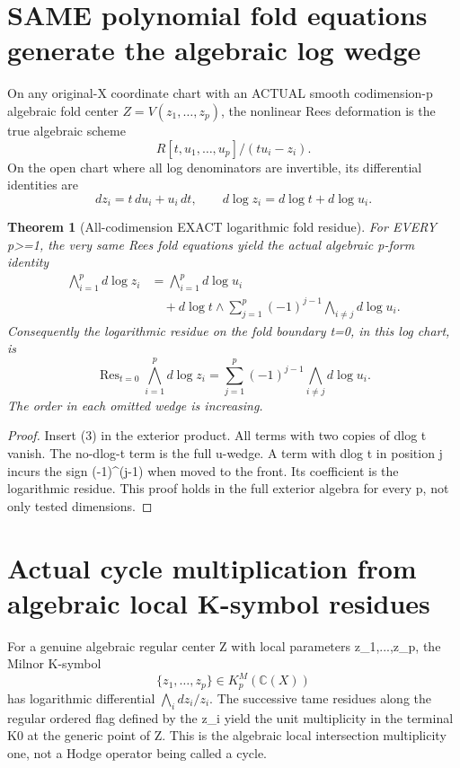\documentclass[11pt]{article}
\newtheorem{theorem}{Theorem}[section]
\begin{document}
\section{SAME polynomial fold equations generate the algebraic log wedge}
On any original-X coordinate chart with an ACTUAL
smooth codimension-p algebraic fold center
$Z=V(z_1,\dots,z_p)$, the nonlinear
Rees deformation is the true algebraic scheme
\[
 R[t,u_1,\dots,u_p]/(t u_i-z_i).
\]
On the open chart where all log denominators
are invertible, its differential identities are
\[
 \boxed{dz_i=t\,du_i+u_i\,dt,\qquad
 d\log z_i=d\log t+d\log u_i.}                  \tag{3}
\]

\begin{theorem}[All-codimension EXACT logarithmic fold residue]
For EVERY p>=1, the very same Rees
fold equations yield the actual algebraic
p-form identity
\[
 \boxed{
 \begin{aligned}
 \bigwedge_{i=1}^p d\log z_i
  &=\bigwedge_{i=1}^p d\log u_i\\
  &\quad+d\log t\wedge
   \sum_{j=1}^p(-1)^{j-1}
     \bigwedge_{i\ne j}d\log u_i .
 \end{aligned}}                                         \tag{4}
\]
Consequently the logarithmic residue on
the fold boundary t=0, in this log chart, is
\[
 \boxed{\operatorname{Res}_{t=0}
   \bigwedge_{i=1}^p d\log z_i
    =\sum_{j=1}^p(-1)^{j-1}
       \bigwedge_{i\ne j}d\log u_i.}             \tag{5}
\]
The order in each omitted wedge is increasing.
\end{theorem}
\begin{proof}
Insert (3) in the exterior product.
All terms with two copies of dlog t vanish.
The no-dlog-t term is the full u-wedge.
A term with dlog t in position j incurs
the sign (-1)^(j-1) when moved to the front.
Its coefficient is the logarithmic residue.
This proof holds in the full exterior algebra
for every p, not only tested dimensions.
\end{proof}

\section{Actual cycle multiplication from algebraic local K-symbol residues}
For a genuine algebraic regular center
Z with local parameters z_1,...,z_p,
the Milnor K-symbol
\[
 \boxed{\{z_1,\dots,z_p\}\in
              K_p^M(\mathbb C(X))}
                                                               \tag{6}
\]
has logarithmic differential
$\bigwedge_i dz_i/z_i$.
The successive tame residues along the
regular ordered flag defined by the
z_i yield the unit multiplicity in
the terminal K0 at the generic point of Z.
This is the algebraic local intersection
multiplicity one, not a Hodge operator
being called a cycle.
\end{document}
